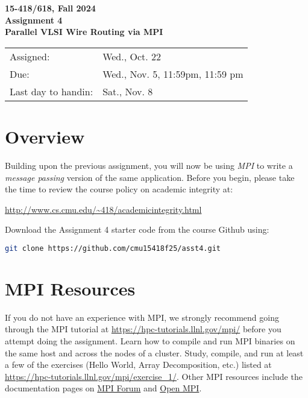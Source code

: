 \documentclass[11pt]{article}
\begin{document}
\begin{center}
{\Large \textbf{15-418/618, Fall 2024}} \\[0.5em]
{\Large \textbf{Assignment 4}} \\[0.3em]
{\Large \textbf{Parallel VLSI Wire Routing via MPI}}
\end{center}

\vspace{2em}

\begin{center}
\begin{tabular}{ll}
\hline
Assigned: & Wed., Oct. 22 \\
Due: & Wed., Nov. 5, 11:59pm, 11:59 pm \\
Last day to handin: & Sat., Nov. 8 \\
\hline
\end{tabular}
\end{center}

\vspace{1.5em}

\section*{Overview}

Building upon the previous assignment, you will now be using \textit{MPI} to write a \textit{message passing} version of the same application. Before you begin, please take the time to review the course policy on academic integrity at:

\begin{center}
\url{http://www.cs.cmu.edu/~418/academicintegrity.html}
\end{center}

Download the Assignment 4 starter code from the course Github using:

\begin{lstlisting}[language=bash]
git clone https://github.com/cmu15418f25/asst4.git
\end{lstlisting}

\section*{MPI Resources}

If you do not have an experience with MPI, we strongly recommend going through the MPI tutorial at \url{https://hpc-tutorials.llnl.gov/mpi/} before you attempt doing the assignment. Learn how to compile and run MPI binaries on the same host and across the nodes of a cluster. Study, compile, and run at least a few of the exercises (Hello World, Array Decomposition, etc.) listed at \url{https://hpc-tutorials.llnl.gov/mpi/exercise_1/}. Other MPI resources include the documentation pages on \href{https://www.mpi-forum.org/}{MPI Forum} and \href{https://www.open-mpi.org/}{Open MPI}.
\end{document}
